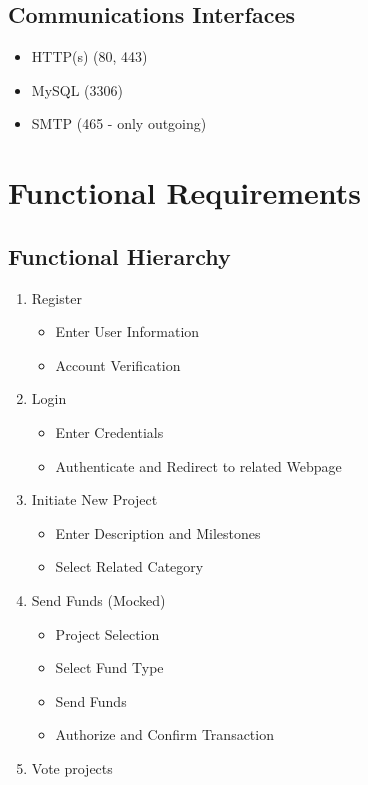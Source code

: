 \documentclass{scrreprt}
\begin{document}
\section{Communications Interfaces}
\begin{itemize}
    \item HTTP(s) (80, 443)
    \item MySQL (3306)
    \item SMTP (465 - only outgoing)
\end{itemize}

\chapter{Functional Requirements}

\section{Functional Hierarchy}

\begin{enumerate}
    \item Register
        \begin{itemize}
            \item Enter User Information
            \item Account Verification
        \end{itemize}
    \item Login
        \begin{itemize}
            \item Enter Credentials
            \item Authenticate and Redirect to related Webpage
        \end{itemize}
    \item Initiate New Project
        \begin{itemize}
            \item Enter Description and Milestones
            \item Select Related Category
        \end{itemize}
    \item Send Funds (Mocked)
        \begin{itemize}
            \item Project Selection
            \item Select Fund Type
            \item Send Funds
            \item Authorize and Confirm Transaction
        \end{itemize}
    \item Vote projects
\end{enumerate}
\end{document}
